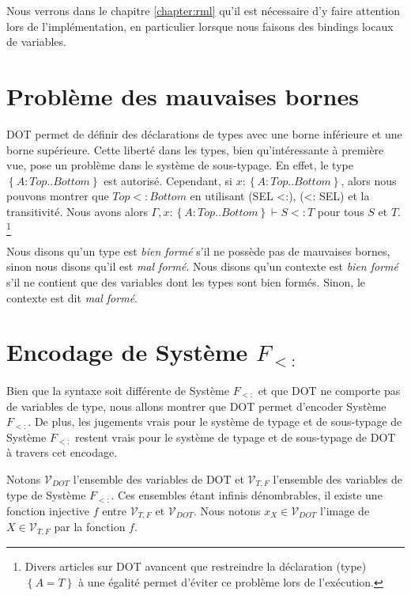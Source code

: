 Nous verrons dans le chapitre \ref{chapter:rml} qu'il est nécessaire d'y faire
attention lors de l'implémentation, en particulier lorsque nous faisons des
bindings locaux de variables.


\section{Problème des mauvaises bornes}

DOT permet de définir des déclarations de types avec une borne inférieure et une
borne supérieure. Cette liberté dans les types, bien qu'intéressante à première
vue, pose un problème dans le système de sous-typage.
En effet, le type $\left\{ A : Top .. Bottom \right\}$ est autorisé. Cependant,
si $x : \left\{ A : Top .. Bottom \right\}$, alors nous pouvons montrer que
$Top <: Bottom$ en utilisant (SEL <:), (<: SEL) et la transitivité. Nous avons
alors $\Gamma, x : \left\{ A : Top .. Bottom \right\} \vdash S <: T$ pour tous
$S$ et $T$.
\footnote{Divers articles sur DOT \cite{OOPSLA-DOT-2016} avancent que restreindre la
déclaration (type) $\left\{ A = T \right\}$ à une égalité permet d'éviter ce
problème lors de l'exécution.}

Nous disons qu'un type est \textit{bien formé} s'il ne possède pas de mauvaises
bornes, sinon nous disons qu'il est \textit{mal formé}. Nous disons qu'un
contexte est \textit{bien formé} s'il ne contient que des variables dont les types
sont bien formés. Sinon, le contexte est dit \textit{mal formé}.

\section{Encodage de Système $F_{<:}$}

Bien que la syntaxe soit différente de Système $F_{<:}$ et que DOT ne comporte
pas de variables de type, nous allons montrer que DOT permet d'encoder Système
$F_{<:}$. De plus, les jugements vrais pour le système de typage et de
sous-typage de Système $F_{<:}$ restent vrais pour le système de typage et de
sous-typage de DOT à travers cet encodage.

Notons $\mathcal{V}_{DOT}$ l'ensemble des variables de DOT et $\mathcal{V}_{T,
  F}$ l'ensemble des variables de type de Système $F_{<:}$. Ces ensembles 
étant infinis dénombrables, il existe une fonction injective $f$ entre
$\mathcal{V}_{T, F}$ et $\mathcal{V}_{DOT}$. Nous notons $x_{X} \in
\mathcal{V}_{DOT}$ l'image de $X \in \mathcal{V}_{T, F}$ par la fonction $f$.

